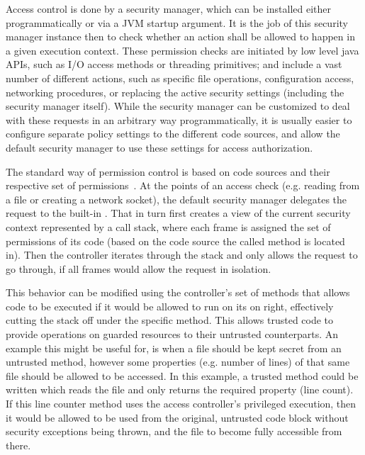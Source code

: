 	Access control is done by a security manager, which can be installed either programmatically or via a JVM startup argument. It is the job of this security manager instance then to check whether an action shall be allowed to happen in a given execution context. These permission checks are initiated by low level java APIs, such as I/O access methods or threading primitives; and include a vast number of different actions, such as specific file operations, configuration access, networking procedures, or replacing the active security settings (including the security manager itself). While the security manager can be customized to deal with these requests in an arbitrary way programmatically, it is usually easier to configure separate policy settings to the different code sources, and allow the default security manager to use these settings for access authorization.
	
	The standard way of permission control is based on code sources and their respective set of permissions~\cite{JavaAccessControl}. At the points of an access check (e.g. reading from a file or creating a network socket), the default security manager delegates the request to the built-in . That in turn first creates a view of the current security context represented by a call stack, where each frame is assigned the set of permissions of its code (based on the code source the called method is located in). Then the controller iterates through the stack and only allows the request to go through, if all frames would allow the request in isolation.
	
	This behavior can be modified using the controller's set of  methods that allows code to be executed if it would be allowed to run on its on right, effectively cutting the stack off under the specific method. This allows trusted code to provide operations on guarded resources to their untrusted counterparts. An example this might be useful for, is when a file should be kept secret from an untrusted method, however some properties (e.g. number of lines) of that same file should be allowed to be accessed. In this example, a trusted method could be written which reads the file and only returns the required property (line count). If this line counter method uses the access controller's privileged execution, then it would be allowed to be used from the original, untrusted code block without security exceptions being thrown, and the file to become fully accessible from there.

